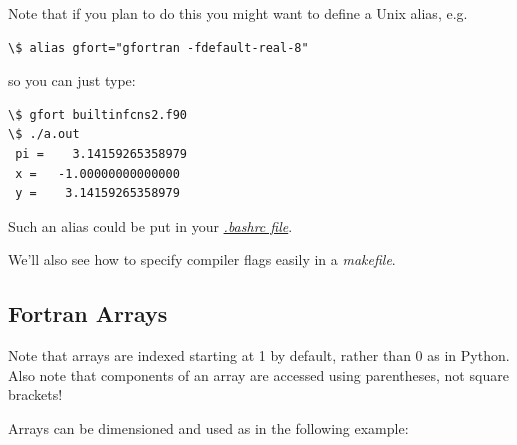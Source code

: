 \documentclass[letterpaper,10pt,english]{sphinxmanual}
\begin{document}
Note that if you plan to do this you might want to define a Unix alias, e.g.

\begin{Verbatim}[commandchars=\\\{\}]
\$ alias gfort="gfortran -fdefault-real-8"
\end{Verbatim}

so you can just type:

\begin{Verbatim}[commandchars=\\\{\}]
\$ gfort builtinfcns2.f90
\$ ./a.out
 pi =    3.14159265358979
 x =   -1.00000000000000
 y =    3.14159265358979
\end{Verbatim}

Such an alias could be put in your {\hyperref[unix:bashrc]{\emph{.bashrc file}}}.

We'll also see how to specify compiler flags easily in a \emph{makefile}.


\subsection{Fortran Arrays}
\label{fortran:fortran-arrays}\label{fortran:id2}
Note that arrays are indexed starting at 1 by default, rather than 0 as in
Python.  Also note that components of an array are accessed using
parentheses, not square brackets!

Arrays can be dimensioned and used as in the following example:
\end{document}
